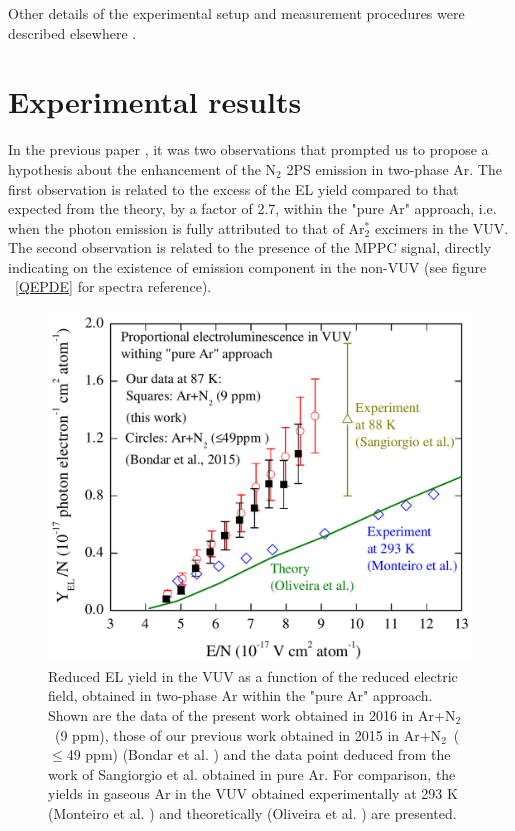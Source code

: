 \documentclass[a4paper,11pt]{article}
\begin{document}
Other details of the experimental setup and measurement procedures were described elsewhere \cite{CRADPropEL15,CRADELGap17}.


\section{Experimental results}

In the previous paper \cite{CRADPropEL15}, it was two observations that prompted us to propose a hypothesis about the enhancement of the N$_2$ 2PS emission in two-phase Ar. The first observation is related to the excess of the EL yield compared to that expected from the theory, by a factor of 2.7, within the "pure Ar" approach, i.e. when the photon emission is fully attributed to that of Ar$^{\ast}_2$ excimers in the VUV. The second observation is related to the presence of the MPPC signal, directly indicating on the existence of emission component in the non-VUV (see figure ~\ref{QEPDE} for spectra reference).

\begin{figure}[hbt]
	\centering
	\includegraphics[width=0.6\columnwidth,keepaspectratio]{fig5}
	\caption{Reduced EL yield in the VUV as a function of the reduced electric field, obtained in two-phase Ar within the "pure Ar" approach. Shown are the data of the present work  obtained in 2016 in Ar+N$_2$~(9 ppm), those of our previous work obtained in 2015 in Ar+N$_2$~($\leq$49 ppm) (Bondar et al. \cite{CRADPropEL15}) and the data point deduced from the work of Sangiorgio et al. \cite{Sangiorgio13} obtained in pure Ar. For  comparison, the yields in gaseous Ar in the VUV obtained experimentally at 293 K (Monteiro et al. \cite{ArELExp08}) and theoretically (Oliveira et al. \cite{ArELTheory11}) are presented.}
	\label{PEPureAr}
\end{figure}
\end{document}
